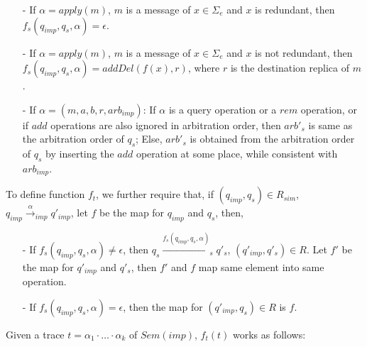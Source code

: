 \begin{itemize}
\setlength{\itemsep}{0.5pt}
\item[-] If $\alpha = apply(m)$, $m$ is a message of $x \in \Sigma_e$ and $x$ is redundant, then $f_s(q_{\mathit{imp}},q_s,\alpha) = \epsilon$. 

\item[-] If $\alpha = apply(m)$, $m$ is a message of $x \in \Sigma_e$ and $x$ is not redundant, then $f_s(q_{\mathit{imp}},q_s,\alpha) = addDel(f(x),r)$, where $r$ is the destination replica of $m$. 

\item[-] If $\alpha = (m,a,b,r,\mathit{arb}_{\mathit{imp}})$: If $\alpha$ is a query operation or a $\mathit{rem}$ operation, or if $add$ operations are also ignored in arbitration order, then $\mathit{arb}'_s$ is same as the arbitration order of $q_s$; Else, $\mathit{arb}'_s$ is obtained from the arbitration order of $q_s$ by inserting the $add$ operation at some place, while consistent with $\mathit{arb}_{\mathit{imp}}$.
\end{itemize} 

To define function $f_t$, we further require that, if $(q_{\mathit{imp}},q_s) \in R_{\mathit{sim}}$, $q_{\mathit{imp}} {\xrightarrow{\alpha}}_{\mathit{imp}} q'_{\mathit{imp}}$, let $f$ be the map for $q_{\mathit{imp}}$ and $q_s$, then, 

\begin{itemize}
\setlength{\itemsep}{0.5pt}
\item[-] If $f_s(q_{\mathit{imp}},q_s,\alpha) \neq \epsilon$, then $q_s {\xrightarrow{f_s(q_{\mathit{imp}},q_s,\alpha)}}_s q'_s$, $(q'_{\mathit{imp}},q'_s) \in R$. Let $f'$ be the map for $q'_{\mathit{imp}}$ and $q'_s$, then $f'$ and $f$ map same element into same operation. 

\item[-] If $f_s(q_{\mathit{imp}},q_s,\alpha) = \epsilon$, then the map for $(q'_{\mathit{imp}},q_s) \in R$ is $f$.  
\end{itemize}

Given a trace $t = \alpha_1 \cdot \ldots \cdot \alpha_k$ of $Sem(imp)$, $f_t(t)$ works as follows: 

